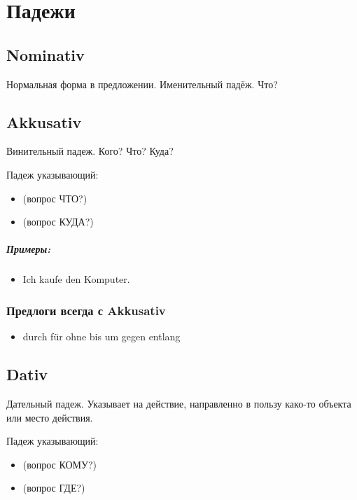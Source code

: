 \chapter{Падежи}

\section{Nominativ}

Нормальная форма в предложении. Именительный падёж. Что?

\section{Akkusativ}

Винительный падеж. Кого? Что? Куда?

Падеж указывающий:
\begin{itemize}
 \item {} (вопрос ЧТО?)
 \item {} (вопрос КУДА?)
\end{itemize}

\paragraph{Примеры:}
\begin{itemize}
\item Ich kaufe den Komputer.
~\\ 
\end{itemize}

\subsection{Предлоги всегда с Akkusativ}
\begin{itemize}
\item  durch für ohne bis um gegen entlang
\end{itemize}

\section{Dativ}

Дательный падеж. Указывает на действие, направленно в пользу како-то объекта или место действия.

Падеж указывающий:
\begin{itemize}
 \item {} (вопрос КОМУ?)
 \item {} (вопрос ГДЕ?)
\end{itemize}

